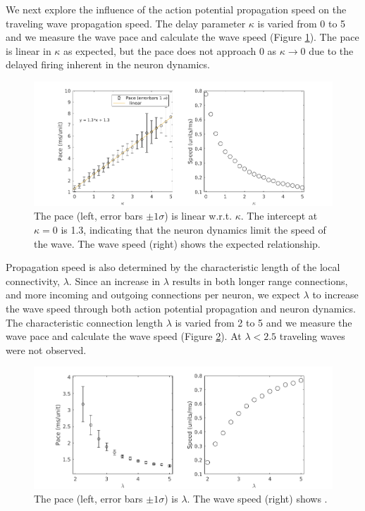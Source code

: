 \documentclass[a4paper,11pt]{article}
\begin{document}
We next explore the influence of the action potential propagation speed on the traveling wave propagation speed.
The delay parameter $\kappa$ is varied from 0 to 5 and we measure the wave pace and calculate the wave speed (Figure \ref{fig:delay_speed}).
The pace is linear in $\kappa$ as expected, but the pace does not approach $0$ as $\kappa \rightarrow 0$ due to the delayed firing inherent in the neuron dynamics.
\begin{figure}[!htb]
 \caption{The pace (left, error bars $\pm 1 \sigma$) is linear w.r.t. $\kappa$. The intercept at $\kappa=0$ is 1.3, indicating that the neuron dynamics limit the speed of the wave. The wave speed (right) shows the expected relationship. }
 \label{fig:delay_speed}
 \centering
   \includegraphics[width=\textwidth]{fig/WaveSpeed_Delay}
\end{figure}

\FloatBarrier

Propagation speed is also determined by the characteristic length of the local connectivity, $\lambda$.
Since an increase in $\lambda$ results in both longer range connections, and more incoming and outgoing connections per neuron, we expect $\lambda$ to increase the wave speed through both action potential propagation and neuron dynamics.
The characteristic connection length $\lambda$ is varied from 2 to 5 and we measure the wave pace and calculate the wave speed (Figure \ref{fig:delay_lambda}).
At $\lambda<2.5$ traveling waves were not observed.
\begin{figure}[!htb]
 \caption{ The pace (left, error bars $\pm 1 \sigma$) is  $\lambda$. The wave speed (right) shows . }
 \label{fig:delay_lambda}
 \centering
   \includegraphics[width=\textwidth]{fig/WaveSpeed_Lambda}
\end{figure}
\end{document}
